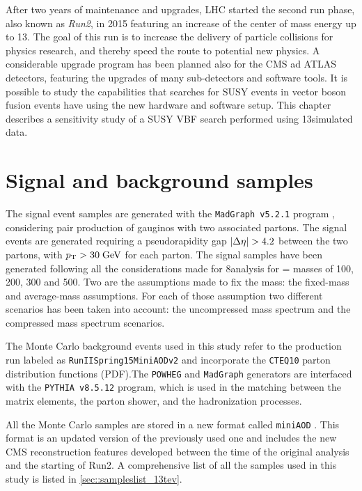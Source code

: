 

After two years of maintenance and upgrades, LHC started the second run phase, also known as \textit{Run2}, in 2015 featuring an increase of the center of mass energy up to 13\tev. The goal of this run is to increase the delivery of particle collisions for physics research, and thereby speed the route to potential new physics. A considerable upgrade program has been planned also for the CMS ad ATLAS detectors, featuring the upgrades of many sub-detectors and software tools. It is possible to study the capabilities that searches for SUSY events in vector boson fusion events have using the new hardware and software setup. This chapter describes a sensitivity study of a SUSY VBF search performed using 13\tev simulated data.

\section{Signal and background samples}

The signal event samples are generated with the \texttt{MadGraph v5.2.1} program \cite{Alwall:2011uj}, considering pair production of gauginos with two associated partons. The signal events are generated requiring a pseudorapidity gap $|\Delta\eta| > 4.2$ between the two partons, with $p_{\text{T}} > 30\;\text{Ge}\kern-0.06667em\text{V}$ for each parton. The signal samples have been generated following all the considerations made for 8\tev analysis for \charginopm = \neutralinotwo masses of 100, 200, 300 and 500\gev. Two are the assumptions made to fix the \stau mass: the fixed-mass and average-mass assumptions. For each of those assumption two different scenarios has been taken into account: the uncompressed mass spectrum and the compressed mass spectrum scenarios.

The Monte Carlo background events used in this study refer to the production run labeled as \texttt{RunIISpring15MiniAODv2} and incorporate the \texttt{CTEQ10} \cite{Dulat:2013hea} parton distribution functions (PDF).The \texttt{POWHEG} and \texttt{MadGraph} generators are interfaced with the \texttt{PYTHIA v8.5.12} \cite{Sjostrand:2006za} program, which is used in the matching between the matrix elements, the parton shower, and the hadronization processes. 

All the Monte Carlo samples are stored in a new format called \texttt{miniAOD} \cite{bib:WorkBookMiniAOD}. This format is an updated version of the previously used one and includes the new CMS reconstruction features developed between the time of the original analysis and the starting of Run2. A comprehensive list of all the samples used in this study is listed in \autoref{sec::sampleslist_13tev}.

